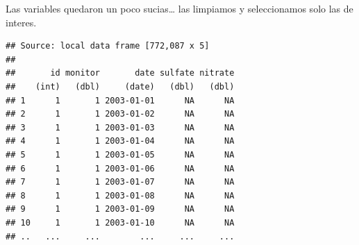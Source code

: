 \documentclass[]{article}
\newenvironment{Shaded}{\begin{snugshade}}{\end{snugshade}}
\newcommand{\KeywordTok}[1]{\textcolor[rgb]{0.13,0.29,0.53}{\textbf{{#1}}}}
\newcommand{\DataTypeTok}[1]{\textcolor[rgb]{0.13,0.29,0.53}{{#1}}}
\newcommand{\StringTok}[1]{\textcolor[rgb]{0.31,0.60,0.02}{{#1}}}
\newcommand{\NormalTok}[1]{{#1}}
\begin{document}
Las variables quedaron un poco sucias\ldots{} las limpiamos y
seleccionamos solo las de interes.

\begin{Shaded}
\end{Shaded}

\begin{verbatim}
## Source: local data frame [772,087 x 5]
## 
##       id monitor       date sulfate nitrate
##    (int)   (dbl)     (date)   (dbl)   (dbl)
## 1      1       1 2003-01-01      NA      NA
## 2      1       1 2003-01-02      NA      NA
## 3      1       1 2003-01-03      NA      NA
## 4      1       1 2003-01-04      NA      NA
## 5      1       1 2003-01-05      NA      NA
## 6      1       1 2003-01-06      NA      NA
## 7      1       1 2003-01-07      NA      NA
## 8      1       1 2003-01-08      NA      NA
## 9      1       1 2003-01-09      NA      NA
## 10     1       1 2003-01-10      NA      NA
## ..   ...     ...        ...     ...     ...
\end{verbatim}
\end{document}

